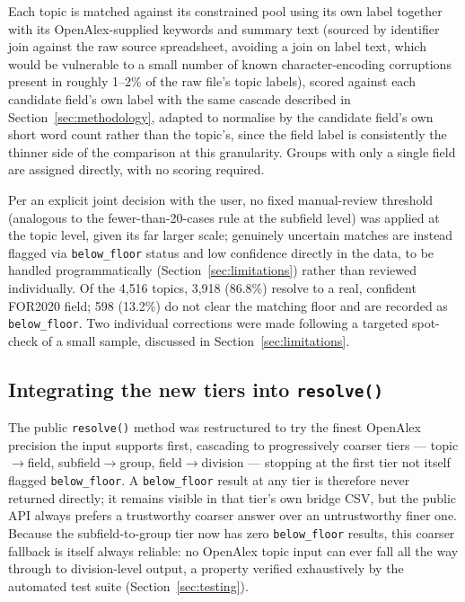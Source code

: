 \documentclass[11pt]{article}
\begin{document}
Each topic is matched against its constrained pool using its own label together with its
OpenAlex-supplied keywords and summary text (sourced by identifier join against the raw
source spreadsheet, avoiding a join on label text, which would be vulnerable to a small
number of known character-encoding corruptions present in roughly 1--2\% of the raw
file's topic labels), scored against each candidate field's own label with the same
cascade described in Section~\ref{sec:methodology}, adapted to normalise by the
candidate field's own short word count rather than the topic's, since the field label is
consistently the thinner side of the comparison at this granularity. Groups with only a
single field are assigned directly, with no scoring required.

Per an explicit joint decision with the user, no fixed manual-review threshold
(analogous to the fewer-than-20-cases rule at the subfield level) was applied at the
topic level, given its far larger scale; genuinely uncertain matches are instead flagged
via \texttt{below\_floor} status and low confidence directly in the data, to be handled
programmatically (Section~\ref{sec:limitations}) rather than reviewed individually. Of
the 4{,}516 topics, 3{,}918 (86.8\%) resolve to a real, confident FOR2020 field; 598
(13.2\%) do not clear the matching floor and are recorded as \texttt{below\_floor}. Two
individual corrections were made following a targeted spot-check of a small sample,
discussed in Section~\ref{sec:limitations}.

\subsection{Integrating the new tiers into \texttt{resolve()}}

The public \texttt{resolve()} method was restructured to try the finest OpenAlex
precision the input supports first, cascading to progressively coarser tiers ---
topic$\rightarrow$field, subfield$\rightarrow$group, field$\rightarrow$division ---
stopping at the first tier not itself flagged \texttt{below\_floor}. A
\texttt{below\_floor} result at any tier is therefore never returned directly; it remains
visible in that tier's own bridge CSV, but the public API always prefers a trustworthy
coarser answer over an untrustworthy finer one. Because the subfield-to-group tier now
has zero \texttt{below\_floor} results, this coarser fallback is itself always reliable:
no OpenAlex topic input can ever fall all the way through to division-level output, a
property verified exhaustively by the automated test suite (Section~\ref{sec:testing}).
\end{document}
